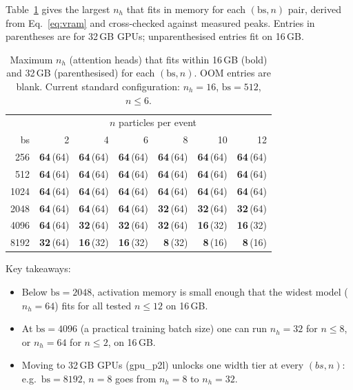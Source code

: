 Table~\ref{tab:maxnh} gives the largest $n_h$ that fits in memory
for each $(\mathrm{bs}, n)$ pair, derived from Eq.~\eqref{eq:vram}
and cross-checked against measured peaks.  Entries in parentheses are
for 32\,GB GPUs; unparenthesised entries fit on 16\,GB.

\begin{table}[h]
\centering
\caption{%
  Maximum $n_h$ (attention heads) that fits within 16\,GB (bold) and
  32\,GB (parenthesised) for each $(\mathrm{bs}, n)$.
  OOM entries are blank.
  Current standard configuration: $n_h=16$, $\mathrm{bs}=512$, $n\leq 6$.}
\label{tab:maxnh}
\begin{tabular}{r|rrrrrr}
\hline
      & \multicolumn{6}{c}{$n$ particles per event} \\
bs    & 2    & 4    & 6    & 8    & 10   & 12   \\
\hline
  256 & \textbf{64}\,(64) & \textbf{64}\,(64) & \textbf{64}\,(64) & \textbf{64}\,(64) & \textbf{64}\,(64) & \textbf{64}\,(64) \\
  512 & \textbf{64}\,(64) & \textbf{64}\,(64) & \textbf{64}\,(64) & \textbf{64}\,(64) & \textbf{64}\,(64) & \textbf{64}\,(64) \\
 1024 & \textbf{64}\,(64) & \textbf{64}\,(64) & \textbf{64}\,(64) & \textbf{64}\,(64) & \textbf{64}\,(64) & \textbf{64}\,(64) \\
 2048 & \textbf{64}\,(64) & \textbf{64}\,(64) & \textbf{64}\,(64) & \textbf{32}\,(64) & \textbf{32}\,(64) & \textbf{32}\,(64) \\
 4096 & \textbf{64}\,(64) & \textbf{32}\,(64) & \textbf{32}\,(64) & \textbf{32}\,(64) & \textbf{16}\,(32) & \textbf{16}\,(32) \\
 8192 & \textbf{32}\,(64) & \textbf{16}\,(32) & \textbf{16}\,(32) & \textbf{8}\,(32)  & \textbf{8}\,(16)  & \textbf{8}\,(16)  \\
\hline
\end{tabular}
\end{table}

Key takeaways:
\begin{itemize}
  \item Below $\mathrm{bs}=2048$, activation memory is small enough
    that the widest model ($n_h=64$) fits for all tested $n\leq 12$
    on 16\,GB.
  \item At $\mathrm{bs}=4096$ (a practical training batch size) one
    can run $n_h=32$ for $n\leq 8$, or $n_h=64$ for $n\leq 2$, on
    16\,GB.
  \item Moving to 32\,GB GPUs (gpu\_p2l) unlocks one width tier at
    every $(bs, n)$: e.g.\ $\mathrm{bs}=8192$, $n=8$ goes from
    $n_h=8$ to $n_h=32$.
\end{itemize}

